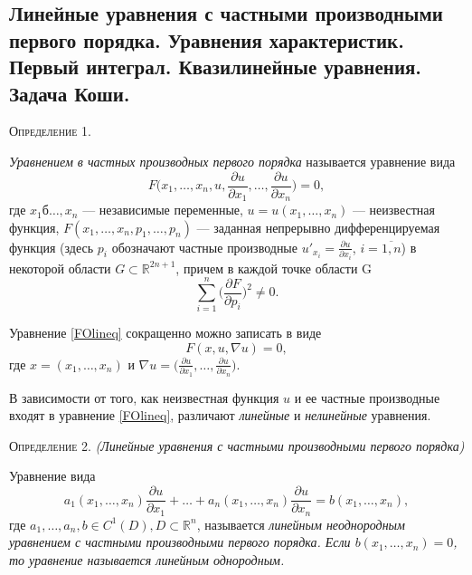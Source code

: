 \subsection{Линейные уравнения с частными производными первого порядка. Уравнения характеристик. Первый интеграл. Квазилинейные уравнения. Задача Коши.}
\label{firstorder_lineq}

\textsc{Определение 1.}

\textit{Уравнением в частных производных первого порядка} называется уравнение вида
\begin{equation} \label{FOlineq}
	F\Big(x_1, \dotsc, x_n, u, \frac{\partial u}{\partial x_1}, \dotsc, \frac{\partial u}{\partial x_n}\Big) = 0,
\end{equation}
где $ x_1б \dotsc, x_n $ --- независимые переменные, $ u = u(x_1, \dotsc, x_n) $ --- неизвестная функция, $ F(x_1, \dotsc, x_n, \allowbreak p_1, \dotsc, p_n) $ --- заданная непрерывно дифференцируемая функция (здесь $ p_i $ обозначают частные производные $ u'_{x_i} = \frac{\partial u}{\partial x_i}$, $i = \overline{1, n}$) в некоторой области $ G \subset \mathbb{R}^{2 n + 1}$, причем в каждой точке области G
\begin{equation*}
	\sum \limits_{i = 1}^{n}\Bigg(\frac{\partial F}{\partial p_i}\Bigg)^2 \not = 0.
\end{equation*}  

Уравнение \eqref{FOlineq} сокращенно можно записать в виде 
\begin{equation} \label{FOsimp}
	F(x, u, \nabla u) = 0, \tag{1'}
\end{equation}
где $ x = (x_1, \dotsc, x_n) $ и $\nabla u = \Big(\frac{\partial u}{\partial x_1}, \dotsc, \frac{\partial u}{\partial x_n}\Big)$.


В зависимости от того, как неизвестная функция $ u $ и ее частные производные входят в уравнение \eqref{FOlineq}, различают \textit{линейные} и \textit{нелинейные} уравнения.


\textsc{Определение 2.} \textit{(Линейные уравнения с частными производными первого порядка)}

Уравнение вида 
\begin{equation}
	a_1(x_1, \dotsc, x_n) \frac{\partial u}{\partial x_1} + \dotsc + a_n(x_1, \dotsc, x_n) \frac{\partial u}{\partial x_n} = b(x_1, \dotsc, x_n),
\end{equation}
где $ a_1, \dotsc, a_n, b \in C^1(D), D \subset \mathbb{R}^{n}$, называется \textit{линейным неоднородным уравнением с частными производными первого порядка. Если $ b(x_1, \dotsc, x_n) = 0$, то уравнение называется линейным однородным.}


